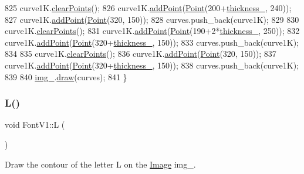 \begin{DoxyCode}
825     curve1K.\mbox{\hyperlink{class_bezier_curve_a0ba8ce66d5af5971ae6a1b506029728e}{clearPoints}}();
826     curve1K.\mbox{\hyperlink{class_bezier_curve_a38d16c18b36ae45619b05e26e226cf34}{addPoint}}(\mbox{\hyperlink{class_point}{Point}}(200+\mbox{\hyperlink{class_font_v1_aed8040e76be9a52833627b92f0fb4e5f}{thickness\_}}, 240));
827     curve1K.\mbox{\hyperlink{class_bezier_curve_a38d16c18b36ae45619b05e26e226cf34}{addPoint}}(\mbox{\hyperlink{class_point}{Point}}(320, 150));
828     curves.push\_back(curve1K);
829 
830     curve1K.\mbox{\hyperlink{class_bezier_curve_a0ba8ce66d5af5971ae6a1b506029728e}{clearPoints}}();
831     curve1K.\mbox{\hyperlink{class_bezier_curve_a38d16c18b36ae45619b05e26e226cf34}{addPoint}}(\mbox{\hyperlink{class_point}{Point}}(190+2*\mbox{\hyperlink{class_font_v1_aed8040e76be9a52833627b92f0fb4e5f}{thickness\_}}, 250));
832     curve1K.\mbox{\hyperlink{class_bezier_curve_a38d16c18b36ae45619b05e26e226cf34}{addPoint}}(\mbox{\hyperlink{class_point}{Point}}(320+\mbox{\hyperlink{class_font_v1_aed8040e76be9a52833627b92f0fb4e5f}{thickness\_}}, 150));
833     curves.push\_back(curve1K);
834 
835     curve1K.\mbox{\hyperlink{class_bezier_curve_a0ba8ce66d5af5971ae6a1b506029728e}{clearPoints}}();
836     curve1K.\mbox{\hyperlink{class_bezier_curve_a38d16c18b36ae45619b05e26e226cf34}{addPoint}}(\mbox{\hyperlink{class_point}{Point}}(320, 150));
837     curve1K.\mbox{\hyperlink{class_bezier_curve_a38d16c18b36ae45619b05e26e226cf34}{addPoint}}(\mbox{\hyperlink{class_point}{Point}}(320+\mbox{\hyperlink{class_font_v1_aed8040e76be9a52833627b92f0fb4e5f}{thickness\_}}, 150));
838     curves.push\_back(curve1K);
839 
840     \mbox{\hyperlink{class_font_v1_a00569e3e3c4b70f437b63f396f735fb0}{img\_}}.\mbox{\hyperlink{class_image_a8d162f3cab956131d58708c09aa560b0}{draw}}(curves);
841 \}
\end{DoxyCode}
\mbox{\label{class_font_v1_a17ba426bfb42af35ea882ab3beeba734}} 
\subsubsection{\texorpdfstring{L()}{L()}}
{\footnotesize\ttfamily void Font\+V1\+::L (\begin{DoxyParamCaption}{ }\end{DoxyParamCaption})}



Draw the contour of the letter L on the \mbox{\hyperlink{class_image}{Image}} img\+\_\+. 


